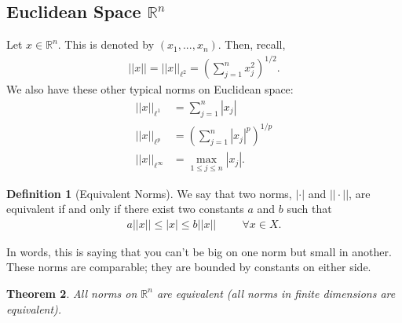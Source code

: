 \documentclass[psamsfonts]{amsart}
\newtheorem{thm}{Theorem}[section]
\theoremstyle{definition}
\newtheorem{defn}[thm]{Definition}
\theoremstyle{remark}
\newcommand{\R}[0]{\mathbb{R}}
\numberwithin{equation}{section}
\begin{document}
\subsection{Euclidean Space \( \R^n \)}
Let \( x \in \R^n \). This is denoted by \( (x_1, ..., x_n) \). Then, recall, 
\begin{align*}
	||x || = || x ||_{\ell^2} = \left( \sum_{j=1}^n x_j^2 \right)^{1/2}. 
\end{align*}
We also have these other typical norms on Euclidean space:
\begin{align*}
	|| x||_{\ell^1}  &= \sum_{j=1}^n |x_j | \\
	||x||_{\ell^p} & = \left( \sum_{j=1}^n |x_j|^p \right)^{1/p} \\
	|| x ||_{\ell^\infty} & = \max_{1 \leq j \leq n } |x_j |.
\end{align*}

\begin{defn}[Equivalent Norms]
	We say that two norms, \( | \cdot | \) and \( || \cdot || \), are equivalent if and only if there exist two constants \( a \) and \( b \) such that
	\begin{align}
		\boxed{a||x|| \leq |x | \leq b || x|| \hspace{1cm} \forall x \in X.}	
	\end{align}
\end{defn}
In words, this is saying that you can't be big on one norm but small in another. These norms are comparable; they are bounded by constants on either side. 

\begin{thm}
	All norms on \( \R^n \) are equivalent (all norms in finite dimensions are equivalent).
\end{thm}
\end{document}
